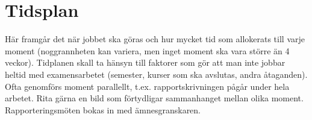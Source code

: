 \documentclass[12pt]{article}
\begin{document}
\section{Tidsplan}

Här framgår det när jobbet ska göras och hur mycket tid som allokerats till varje moment (noggrannheten kan variera, men inget moment ska vara större än 4 veckor). Tidplanen skall
ta hänsyn till faktorer som gör att man inte jobbar heltid med examensarbetet (semester, kurser som ska avslutas, andra åtaganden). Ofta genomförs moment parallellt, t.ex.
rapportskrivningen pågår under hela arbetet. Rita gärna en bild som förtydligar sammanhanget mellan olika moment. Rapporteringsmöten bokas in med ämnesgranskaren.
\end{document}
